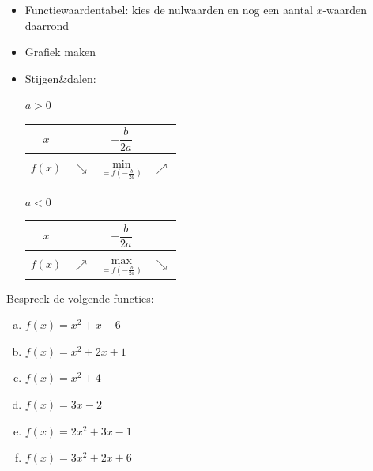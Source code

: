 \documentclass[12pt]{article}
\begin{document}
\begin{mdframed}
\begin{itemize}
  \item Functiewaardentabel: kies de nulwaarden en nog een aantal $x$-waarden daarrond
  \item Grafiek maken
  \item Stijgen\&dalen:\\
    \begin{minipage}{0.45\textwidth}
      \centering $a>0$\\
      \begin{tabular}{c|lcr}
        $x$ &  & $-\dfrac{b}{2a}$ & \\[0.1cm]
        \hline
        $f(x)$ & $\searrow$ & $\underset{=f(-\frac{b}{2a})}{\mbox{min}}$ & $\nearrow$
      \end{tabular}
    \end{minipage}
    \begin{minipage}{0.45\textwidth}
      \centering $a<0$\\
      \begin{tabular}{c|lcr}
        $x$ &  & $-\dfrac{b}{2a}$ & \\[0.1cm]
        \hline
        $f(x)$ & $\nearrow$ & $\underset{=f(-\frac{b}{2a})}{\mbox{max}}$ & $\searrow$
      \end{tabular}
    \end{minipage}
  \end{itemize}
\end{mdframed}

\begin{oefening}
  Bespreek de volgende functies:
  \begin{enumerate}[(a)]
  \item $f(x)=x^2+x-6$
  \item $f(x)=x^2+2x+1$
  \item $f(x)=x^2+4$
  \item $f(x)=3x-2$
  \item $f(x)=2x^2+3x-1$
  \item $f(x)=3x^2+2x+6$
  \end{enumerate}
\end{oefening}
\end{document}
